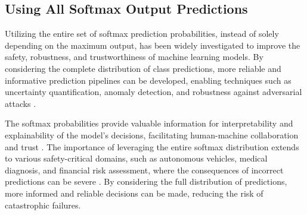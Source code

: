 


\subsection{Using All Softmax Output Predictions}

Utilizing the entire set of softmax prediction probabilities, instead of solely depending on the maximum output, has been widely investigated to improve the safety, robustness, and trustworthiness of machine learning models. By considering the complete distribution of class predictions, more reliable and informative prediction pipelines can be developed, enabling techniques such as uncertainty quantification, anomaly detection, and robustness against adversarial attacks \cite{kendall2017uncertainties, lakshminarayanan2017simple, hendrycks17baseline, goodfellow2014explaining, szegedy2013intriguing, madry2017towards, guo2018countering}.

The softmax probabilities provide valuable information for interpretability and explainability of the model's decisions, facilitating human-machine collaboration and trust \cite{ribeiro2016should, doshi2017towards}. The importance of leveraging the entire softmax distribution extends to various safety-critical domains, such as autonomous vehicles, medical diagnosis, and financial risk assessment, where the consequences of incorrect predictions can be severe \cite{michelmore2018evaluating, leibig2017leveraging}. By considering the full distribution of predictions, more informed and reliable decisions can be made, reducing the risk of catastrophic failures.

